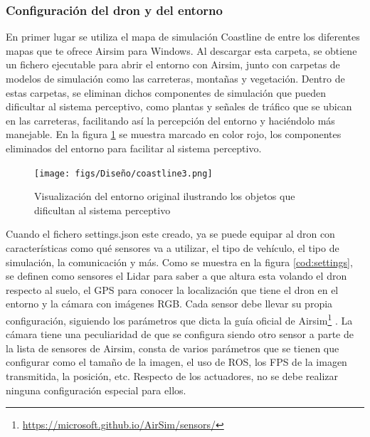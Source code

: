 \subsubsection{Configuración del dron y del entorno}
\label{subsec:Configuración del dron y del entorno}
En primer lugar se utiliza el mapa de simulación Coastline de entre los diferentes mapas que te ofrece Airsim para Windows. Al descargar esta carpeta, 
se obtiene un fichero ejecutable para abrir el entorno con Airsim, junto con carpetas de modelos de simulación como las carreteras, montañas y vegetación. Dentro de estas carpetas, se eliminan dichos componentes 
de simulación que pueden dificultar al sistema perceptivo, como plantas y señales de tráfico que se ubican en las carreteras, facilitando así la percepción del entorno 
y haciéndolo más manejable. En la figura \ref{fig:CoastlineModificado} se muestra marcado en color rojo, los componentes eliminados del entorno para facilitar al sistema 
perceptivo.

\begin{figure} [H]
  \begin{center}
    \texttt{[image: figs/Diseño/coastline3.png]}
  \end{center}
  \caption{Visualización del entorno original ilustrando los objetos que dificultan al sistema perceptivo}
  \label{fig:CoastlineModificado}
  \vspace{-1.5em}
\end{figure}
Cuando el fichero settings.json este creado, ya se puede equipar al dron con características como qué sensores va a utilizar, 
el tipo de vehículo, el tipo de simulación, la comunicación y más. Como se muestra en la figura \ref{cod:settings}, se definen como sensores el Lidar para saber a que altura
esta volando el dron respecto al suelo, el GPS para conocer la localización que tiene el dron en el entorno y la cámara con imágenes
RGB. Cada sensor debe llevar su propia configuración, siguiendo los parámetros que dicta la guía oficial de Airsim\footnote{\url{https://microsoft.github.io/AirSim/sensors/}}
. La cámara tiene una peculiaridad de que se configura siendo otro sensor a parte de la lista de sensores de Airsim, consta de varios parámetros que se tienen que configurar como 
el tamaño de la imagen, el uso de ROS, los FPS de la imagen transmitida, la posición, etc. 
Respecto de los actuadores, no se debe realizar ninguna configuración especial para ellos.

